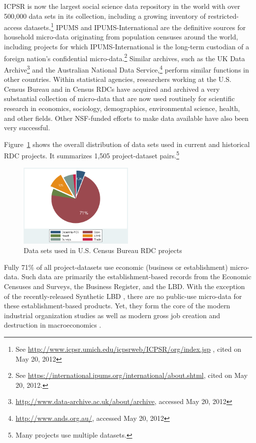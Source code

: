 \ac{ICPSR} is now the largest social science data repository in the world
with over 500,000 data sets in its collection, including a growing inventory
of restricted-access datasets.\footnote{%
See \href{http://www.icpsr.umich.edu/icpsrweb/ICPSR/org/index.jsp}{%
http://www.icpsr.umich.edu/icpsrweb/ICPSR/org/index.jsp} , cited on May 20,
2012} IPUMS and IPUMS-International are the definitive sources for household
micro-data originating from population censuses around the world, including
projects for which IPUMS-International is the long-term custodian of a
foreign nation's confidential micro-data.\footnote{%
See \href{https://international.ipums.org/international/about.shtml}{%
https://international.ipums.org/international/about.shtml}, cited on May 20,
2012.} Similar archives, such as the UK Data Archive\footnote{\href{http://www.data-archive.ac.uk/about/archive}%
{http://www.data-archive.ac.uk/about/archive}, accessed May 20, 2012} and
the Australian National Data Service,\footnote{\href{http://www.ands.org.au/}%
{http://www.ands.org.au/}, accessed May 20, 2012} perform similar functions
in other countries. Within statistical agencies, researchers working at the
U.S. Census Bureau and in Census RDCs have acquired and archived a very
substantial collection of micro-data that are now used routinely for
scientific research in economics, sociology, demographics, environmental
science, health, and other fields. Other \ac{NSF}-funded efforts to make
data available have also been very successful.

Figure~\ref{fig:piechart} shows the overall distribution of data sets used
in current and historical RDC projects. It summarizes 1,505 project-dataset
pairs.\footnote{%
Many projects use multiple datasets.} %
%
\begin{figure}[tbp]
\centering
\caption{Data sets used in U.S. Census Bureau RDC projects}
\label{fig:piechart}\includegraphics[width=0.5\textwidth]{pie-chart-rdc-data}
\end{figure}
Fully 71\% of all project-datasets use economic (business or establishment)
micro-data. Such data are primarily the establishment-based records from the
Economic Censuses and Surveys, the Business Register, and the \ac{LBD}. With
the exception of the recently-released Synthetic LBD \cite%
{AbowdVilhuber2010,KinneyEtAl2011}, there are no public-use micro-data for
these establishment-based products. Yet, they form the core of the modern
industrial organization studies \cite%
{DunneRobertsSamuelson1989,OlleyPakes1996} as well as modern gross job
creation and destruction in macroeconomics \cite%
{DavisHaltiwangerSchuh,HaltiwangerJarminMiranda2010}.

